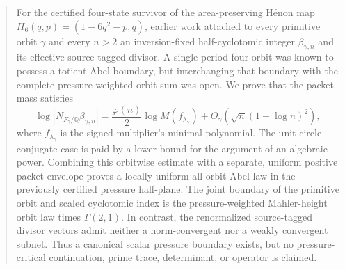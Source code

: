 \begin{abstract}
For the certified four-state survivor of the area-preserving H\'enon map
$H_6(q,p)=(1-6q^2-p,q)$, earlier work attached to every primitive orbit
$\gamma$ and every $n>2$ an inversion-fixed half-cyclotomic integer
$\beta_{\gamma,n}$ and its effective source-tagged divisor.  A single
period-four orbit was known to possess a totient Abel boundary, but
interchanging that boundary with the complete pressure-weighted orbit sum
was open.  We prove that the packet mass satisfies
\[
 \log|N_{F_\gamma/\mathbb Q}\beta_{\gamma,n}|
 =\frac{\varphi(n)}2\log M(f_{\lambda_\gamma})
 +O_\gamma\!\left(\sqrt n(1+\log n)^2\right),
\]
where $f_{\lambda_\gamma}$ is the signed multiplier's minimal polynomial.
The unit-circle conjugate case is paid by a lower bound for the argument of
an algebraic power.  Combining this orbitwise estimate with a separate,
uniform positive packet envelope proves a locally uniform all-orbit Abel
law in the previously certified pressure half-plane.  The joint boundary of
the primitive orbit and scaled cyclotomic index is the pressure-weighted
Mahler-height orbit law times $\Gamma(2,1)$.  In contrast, the renormalized
source-tagged divisor vectors admit neither a norm-convergent nor a weakly
convergent subnet.  Thus a canonical scalar pressure boundary exists, but no
pressure-critical continuation, prime trace, determinant, or operator is
claimed.
\end{abstract}
